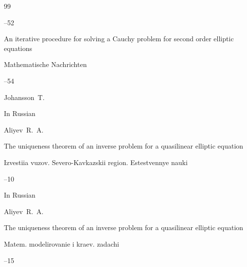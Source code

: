 \begin{thebibliography}{99}



--52








\paper An iterative procedure for solving a Cauchy problem for second order elliptic equations


\jour Mathematische Nachrichten 



--54

\by Johansson~T.










\lang In Russian

\by Aliyev~R.~A.

\paper The uniqueness theorem of an inverse problem for a quasilinear elliptic equation

\jour Izvestiia vuzov. Severo-Kavkazskii region. Estestvennye nauki



--10






\lang In Russian

\by Aliyev~R.~A.

\paper The uniqueness theorem of an inverse problem for a quasilinear elliptic equation

\serial Matem. modelirovanie i kraev. zadachi


--15



\end{thebibliography}

